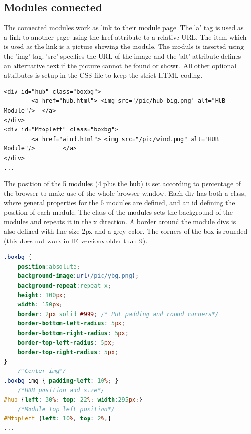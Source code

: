 \subsection{Modules connected}
The connected modules work as link to their module page. The 'a' tag is used as a link to another page using the href attribute to a relative URL. The item which is used as the link is a picture showing the module. The module is inserted using the 'img' tag. 'src' specifies the URL of the image and the 'alt' attribute defines an alternative text if the picture cannot be found or shown. All other optional attributes is setup in the CSS file to keep the strict HTML coding.
\begin{lstlisting}
<div id="hub" class="boxbg">
		<a href="hub.html"> <img src="/pic/hub_big.png" alt="HUB Module"/> 	</a>
</div>
<div id="Mtopleft" class="boxbg">
		<a href="wind.html"> <img src="/pic/wind.png" alt="HUB Module"/> 		</a>
</div>
...
\end{lstlisting}
The position of the 5 modules (4 plus the hub) is set according to percentage of the browser to make use of the whole browser window. Each div has both a class, where general properties for the 5 modules are defined, and an id defining the position of each module. The class of the modules sets the background of the modules and repeats it in the x direction. A border around the module divs is also defined with line size 2px and a grey color. The corners of the box is rounded (this does not work in IE versions older than 9).
\begin{lstlisting}[language=CSS]
.boxbg {
	position:absolute;
	background-image:url(/pic/ybg.png);
	background-repeat:repeat-x;
	height: 100px;
	width: 150px;
	border: 2px solid #999;	/* Put padding and round corners*/
	border-bottom-left-radius: 5px;
	border-bottom-right-radius: 5px;
	border-top-left-radius: 5px;
	border-top-right-radius: 5px;
}
	/*Center img*/
.boxbg img { padding-left: 10%; }
	/*HUB position and size*/
#hub {left: 30%; top: 22%; width:295px;}
	/*Module Top left position*/
#Mtopleft {left: 10%; top: 2%;}
...
\end{lstlisting}

